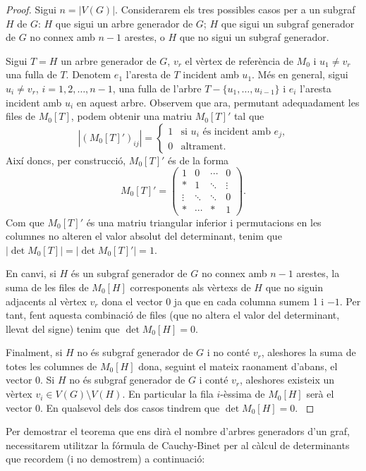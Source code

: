 \documentclass{article}
\begin{document}
    \begin{proof}
    Sigui $n=|V(G)|$. Considerarem els tres possibles casos per a un subgraf $H$ de $G$: $H$ que sigui un arbre generador de $G$; $H$ que sigui un subgraf generador de $G$ no connex amb $n-1$ arestes, o $H$ que no sigui un subgraf generador.\par
    Sigui $T=H$ un arbre generador de $G$, $v_r$ el vèrtex de referència de $M_0$ i $u_1\ne v_r$ una fulla de $T$. Denotem $e_1$ l'aresta de $T$ incident amb $u_1$. Més en general, sigui $u_i\ne v_r$, $i=1,2,\ldots, n-1$, una fulla de l'arbre $T-\{u_1,\ldots,u_{i-1}\}$ i $e_i$ l'aresta incident amb $u_i$ en aquest arbre. Observem que ara, permutant adequadament les files de $M_0[T]$, podem obtenir una matriu $M_0[T]'$ tal que 
    $$
    |(M_0[T]')_{ij}|=\left\{\begin{array}{ll}
        1 & \text{si $u_i$ és incident amb $e_j$,} \\
        0 & \text{altrament.}
    \end{array}\right.$$
    Així doncs, per construcció, $M_0[T]'$ és de la forma
    $$M_0[T]'=\begin{pmatrix}
    1 & 0 & \cdots & 0\\
    * & 1 & \ddots & \vdots \\
    \vdots & \ddots & \ddots & 0\\
    * & \cdots & * & 1
    \end{pmatrix}.$$
    Com que $M_0[T]'$ és una matriu triangular inferior i permutacions en les columnes no alteren el valor absolut del determinant, tenim que $|\det M_0[T]|=|\det M_0[T]'|=1$.\par
    En canvi, si $H$ és un subgraf generador de $G$ no connex amb $n-1$ arestes, la suma de les files de $M_0[H]$ corresponents als vèrtexs de $H$ que no siguin adjacents al vèrtex $v_r$ dona el vector 0 ja que en cada columna sumem 1 i $-1$. Per tant, fent aquesta combinació de files (que no altera el valor del determinant, llevat del signe) tenim que $\det M_0[H]=0$.\par
    Finalment, si $H$ no és subgraf generador de $G$ i no conté $v_r$, aleshores la suma de totes les columnes de $M_0[H]$ dona, seguint el mateix raonament d'abans, el vector 0. Si $H$ no és subgraf generador de $G$ i conté $v_r$, aleshores existeix un vèrtex $v_i\in V(G)\setminus V(H)$. En particular la fila $i$-èssima de $M_0[H]$ serà el vector 0. En qualsevol dels dos casos tindrem que $\det M_0[H]=0$. \cite{1}
    \end{proof}
    Per demostrar el teorema que ens dirà el nombre d'arbres generadors d'un graf, necessitarem utilitzar la fórmula de Cauchy-Binet per al càlcul de determinants que recordem (i no demostrem) a continuació:
\end{document}
